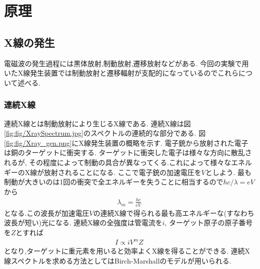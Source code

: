 \section{原理}
\subsection{X線の発生}
電磁波の発生過程には黒体放射,制動放射,遷移放射などがある.
今回の実験で用いたX線発生装置では制動放射と遷移輻射が支配的になっているのでこれらについて述べる.
\subsubsection{連続X線}
連続X線とは制動放射により生じるX線である.
連続X線は図\ref{fig:fig/XraySpectrum.jpg}のスペクトルの連続的な部分である.
図\ref{fig:fig/Xray_gen.png}にX線発生装置の概略を示す.
電子銃から放射された電子は銅のターゲットに衝突する.
ターゲットに衝突した電子は様々な方向に散乱されるが,
その程度によって制動の具合が異なってくる.これによって様々なエネルギーのX線が放射されることになる.
ここで電子銃の加速電圧を$V$としよう.
最も制動が大きいのは1回の衝突で全エネルギーを失うことに相当するので$hc/\lambda=eV$から
\begin{align}
  \lambda_{m}=\frac{hc}{eV}
\end{align}
となる.この波長が加速電圧$V$の連続X線で得られる最も高エネルギーな(すなわち波長が短い)光になる.
連続X線の全強度は管電流を$i$, ターゲット原子の原子番号を$Z$とすれば
\begin{align}
  I\propto iV^mZ
\end{align}
となり,ターゲットに重元素を用いると効率よくX線を得ることができる.\cite{XrayS}
連続X線スペクトルを求める方法としてはBirch-Marshallのモデルが用いられる.\cite{Xraymodel}
